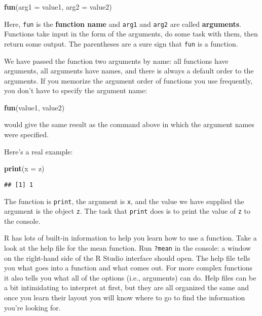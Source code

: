 \documentclass[]{book}
\newenvironment{Shaded}{\begin{snugshade}}{\end{snugshade}}
\newcommand{\KeywordTok}[1]{\textcolor[rgb]{0.13,0.29,0.53}{\textbf{#1}}}
\newcommand{\DataTypeTok}[1]{\textcolor[rgb]{0.13,0.29,0.53}{#1}}
\newcommand{\NormalTok}[1]{#1}
\theoremstyle{definition}
\theoremstyle{definition}
\theoremstyle{definition}
\theoremstyle{remark}
\begin{document}
\begin{Shaded}
\begin{Highlighting}[]
\KeywordTok{fun}\NormalTok{(}\DataTypeTok{arg1 =}\NormalTok{ value1, }\DataTypeTok{arg2 =}\NormalTok{ value2)}
\end{Highlighting}
\end{Shaded}

Here, \texttt{fun} is the \textbf{function name} and \texttt{arg1} and
\texttt{arg2} are called \textbf{arguments}. Functions take input in the
form of the arguments, do some task with them, then return some output.
The parentheses are a sure sign that \texttt{fun} is a function.

We have passed the function two arguments by name: all functions have
arguments, all arguments have names, and there is always a default order
to the arguments. If you memorize the argument order of functions you
use frequently, you don't have to specify the argument name:

\begin{Shaded}
\begin{Highlighting}[]
\KeywordTok{fun}\NormalTok{(value1, value2)}
\end{Highlighting}
\end{Shaded}

would give the same result as the command above in which the argument
names were specified.

Here's a real example:

\begin{Shaded}
\begin{Highlighting}[]
\KeywordTok{print}\NormalTok{(}\DataTypeTok{x =}\NormalTok{ z)}
\end{Highlighting}
\end{Shaded}

\begin{verbatim}
## [1] 1
\end{verbatim}

The function is \texttt{print}, the argument is \texttt{x}, and the
value we have supplied the argument is the object \texttt{z}. The task
that \texttt{print} does is to print the value of \texttt{z} to the
console.

R has lots of built-in information to help you learn how to use a
function. Take a look at the help file for the mean function. Run
\texttt{?mean} in the console: a window on the right-hand side of the R
Studio interface should open. The help file tells you what goes into a
function and what comes out. For more complex functions it also tells
you what all of the options (i.e., arguments) can do. Help files can be
a bit intimidating to interpret at first, but they are all organized the
same and once you learn their layout you will know where to go to find
the information you're looking for.
\end{document}
